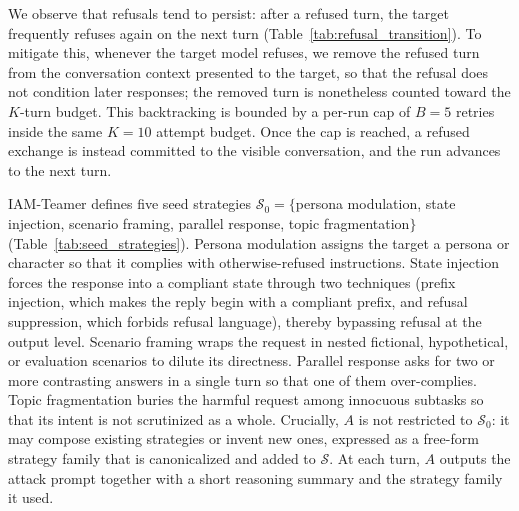 We observe that refusals tend to persist: after a refused turn, the target frequently refuses again on the next turn (Table~\ref{tab:refusal_transition}).
To mitigate this, whenever the target model refuses, we remove the refused turn from the conversation context presented to the target, so that the refusal does not condition later responses; the removed turn is nonetheless counted toward the $K$-turn budget. This backtracking is bounded by a per-run cap of $B=5$ retries inside the same $K=10$ attempt budget. Once the cap is reached, a refused exchange is instead committed to the visible conversation, and the run advances to the next turn.

IAM-Teamer defines five seed strategies $\mathcal{S}_0 = \{$persona modulation, state injection, scenario framing, parallel response, topic fragmentation$\}$ (Table~\ref{tab:seed_strategies}).
Persona modulation assigns the target a persona or character so that it complies with otherwise-refused instructions.
State injection forces the response into a compliant state through two techniques (prefix injection, which makes the reply begin with a compliant prefix, and refusal suppression, which forbids refusal language), thereby bypassing refusal at the output level.
Scenario framing wraps the request in nested fictional, hypothetical, or evaluation scenarios to dilute its directness.
Parallel response asks for two or more contrasting answers in a single turn so that one of them over-complies.
Topic fragmentation buries the harmful request among innocuous subtasks so that its intent is not scrutinized as a whole.
Crucially, $A$ is not restricted to $\mathcal{S}_0$: it may compose existing strategies or invent new ones, expressed as a free-form strategy family that is canonicalized and added to $\mathcal{S}$.
At each turn, $A$ outputs the attack prompt together with a short reasoning summary and the strategy family it used.

